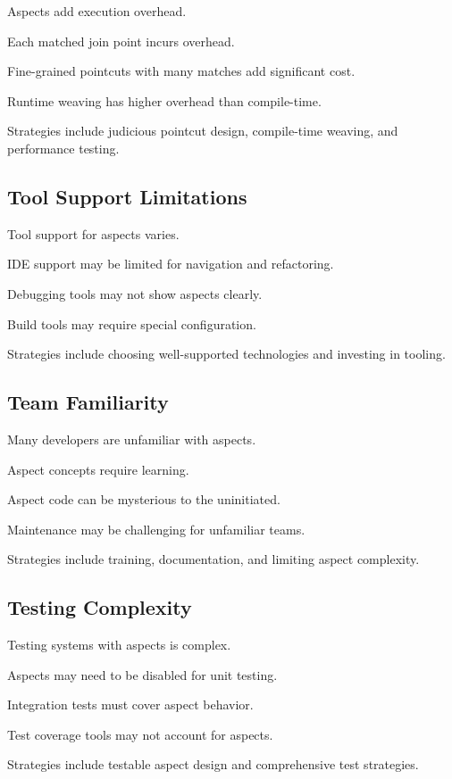 \documentclass[11pt]{article}
\begin{document}
Aspects add execution overhead.

Each matched join point incurs overhead.

Fine-grained pointcuts with many matches add significant cost.

Runtime weaving has higher overhead than compile-time.

Strategies include judicious pointcut design, compile-time weaving, and performance testing.

\subsection{Tool Support Limitations}

Tool support for aspects varies.

IDE support may be limited for navigation and refactoring.

Debugging tools may not show aspects clearly.

Build tools may require special configuration.

Strategies include choosing well-supported technologies and investing in tooling.

\subsection{Team Familiarity}

Many developers are unfamiliar with aspects.

Aspect concepts require learning.

Aspect code can be mysterious to the uninitiated.

Maintenance may be challenging for unfamiliar teams.

Strategies include training, documentation, and limiting aspect complexity.

\subsection{Testing Complexity}

Testing systems with aspects is complex.

Aspects may need to be disabled for unit testing.

Integration tests must cover aspect behavior.

Test coverage tools may not account for aspects.

Strategies include testable aspect design and comprehensive test strategies.

\end{document}
